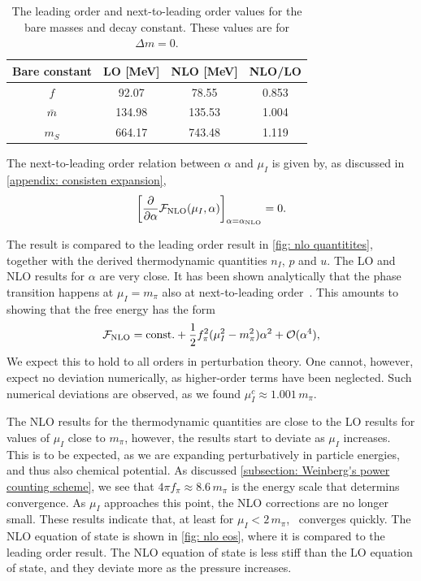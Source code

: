 \begin{table}[H]
    \centering
    \caption{The leading order and next-to-leading order values for the bare masses and decay constant. These values are for $\Delta m = 0$.}
    \label{table: nlo values}
    \begin{tabular}{c c c c}
        \hline \hline
        Bare constant & LO [MeV] & NLO [MeV] & NLO/LO \\
        \hline
        $f$ & 92.07 & 78.55 & 0.853\\
        $\bar m$ & 134.98 & 135.53 & 1.004 \\
        $m_S$ & 664.17 & 743.48 & 1.119 \\
        \hline
    \end{tabular}
\end{table}


The next-to-leading order relation between $\alpha$ and $\mu_I$ is given by, as discussed in \autoref{appendix: consisten expansion},
%
\begin{equation}
    \left[\pdv*{\mathcal{F}_\text{NLO}(\mu_I, \alpha)}{\alpha} \right]_{\alpha = \alpha_\text{NLO}} = 0.
\end{equation}
%

The result is compared to the leading order result in \autoref{fig: nlo quantitites}, together with the derived thermodynamic quantities $n_I$, $p$ and $u$.
The LO and NLO results for $\alpha$ are very close.
It has been shown analytically that the phase transition happens at $\mu_I=m_\pi$ also at next-to-leading order~\autocite{adhikariTwoflavorChiralPerturbation2019}.
This amounts to showing that the free energy has the form
%
\begin{equation}
    \mathcal{F}_\text{NLO} = \mathrm{const.} + \frac{1}{2} f_\pi^2 (\mu_I^2 - m_\pi^2)\alpha^2 + \mathcal O(\alpha^4),
\end{equation}
%
We expect this to hold to all orders in perturbation theory.
One cannot, however, expect no deviation numerically, as higher-order terms have been neglected.
Such numerical deviations are observed, as we found $\mu_I^c \approx 1.001\,m_\pi$.

The NLO results for the thermodynamic quantities are close to the LO results for values of $\mu_I$ close to $m_\pi$, however, the results start to deviate as $\mu_I$ increases.
This is to be expected, as we are expanding perturbatively in particle energies, and thus also chemical potential.
As discussed \autoref{subsection: Weinberg's power counting scheme}, we see that $4\pi f_\pi \approx 8.6 \,m_\pi$ is the energy scale that determins convergence.
As $\mu_I$ approaches this point, the NLO corrections are no longer small.
These results indicate that, at least for $\mu_I< 2\,m_\pi$, \chpt\, converges quickly.
The NLO equation of state is shown in \autoref{fig: nlo eos}, where it is compared to the leading order result.
The NLO equation of state is less stiff than the LO equation of state, and they deviate more as the pressure increases.

